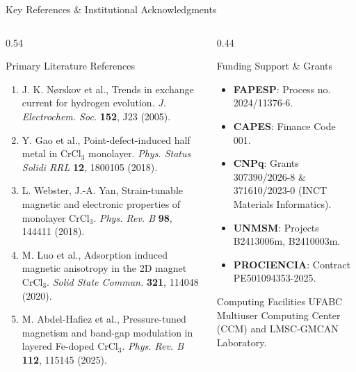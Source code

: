 \documentclass[aspectratio=169]{beamer}
\begin{document}
\begin{frame}{Key References \& Institutional Acknowledgments}
  \begin{columns}[T]
    \begin{column}{0.54\textwidth}
      \begin{block}{Primary Literature References}
        \fontsize{6.5}{7.8}\selectfont
      \begin{enumerate}\setlength{\itemsep}{1.2pt}
          \item J. K. N{\o}rskov et al., Trends in exchange current for hydrogen evolution. \textit{J. Electrochem. Soc.} \textbf{152}, J23 (2005).
          \item Y. Gao et al., Point-defect-induced half metal in $\text{CrCl}_3$ monolayer. \textit{Phys. Status Solidi RRL} \textbf{12}, 1800105 (2018).
          \item L. Webster, J.-A. Yan, Strain-tunable magnetic and electronic properties of monolayer $\text{CrCl}_3$. \textit{Phys. Rev. B} \textbf{98}, 144411 (2018).
          \item M. Luo et al., Adsorption induced magnetic anisotropy in the 2D magnet $\text{CrCl}_3$. \textit{Solid State Commun.} \textbf{321}, 114048 (2020).
          \item M. Abdel-Hafiez et al., Pressure-tuned magnetism and band-gap modulation in layered Fe-doped $\text{CrCl}_3$. \textit{Phys. Rev. B} \textbf{112}, 115145 (2025).
        \end{enumerate}
      \end{block}
    \end{column}

    \begin{column}{0.44\textwidth}
      \begin{exampleblock}{Funding Support \& Grants}
        \scriptsize
      \begin{itemize}\setlength{\itemsep}{1.2pt}
          \item \textbf{FAPESP}: Process no. 2024/11376-6.
          \item \textbf{CAPES}: Finance Code 001.
          \item \textbf{CNPq}: Grants 307390/2026-8 \& 371610/2023-0 (INCT Materials Informatics).
          \item \textbf{UNMSM}: Projects B2413006m, B2410003m.
          \item \textbf{PROCIENCIA}: Contract PE501094353-2025.
        \end{itemize}
      \end{exampleblock}
      \vspace{0.1em}
      \begin{alertblock}{Computing Facilities}
        \scriptsize
        UFABC Multiuser Computing Center (CCM) and LMSC-GMCAN Laboratory.
      \end{alertblock}
    \end{column}
  \end{columns}
\end{frame}
\end{document}
